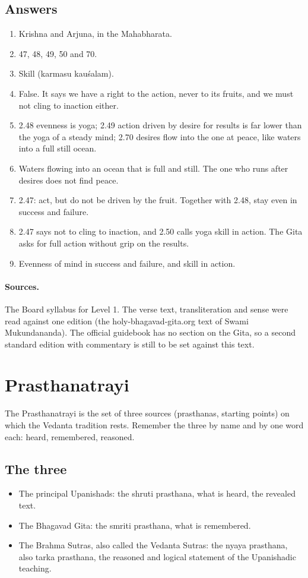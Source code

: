 \subsection*{Answers}
\begin{enumerate}
\item Krishna and Arjuna, in the Mahabharata.
\item 47, 48, 49, 50 and 70.
\item Skill (karmasu kauśalam).
\item False. It says we have a right to the action, never to its fruits, and we must not cling to inaction either.
\item 2.48 evenness is yoga; 2.49 action driven by desire for results is far lower than the yoga of a steady mind; 2.70 desires flow into the one at peace, like waters into a full still ocean.
\item Waters flowing into an ocean that is full and still. The one who runs after desires does not find peace.
\item 2.47: act, but do not be driven by the fruit. Together with 2.48, stay even in success and failure.
\item 2.47 says not to cling to inaction, and 2.50 calls yoga skill in action. The Gita asks for full action without grip on the results.
\item Evenness of mind in success and failure, and skill in action.
\end{enumerate}

\paragraph{Sources.} The Board syllabus for Level 1. The verse text, transliteration and sense were read against one edition (the holy-bhagavad-gita.org text of Swami Mukundananda). The official guidebook has no section on the Gita, so a second standard edition with commentary is still to be set against this text.

\section{Prasthanatrayi}
\label{sec:prasthanatrayi}

The Prasthanatrayi is the set of three sources (prasthanas, starting points) on which the Vedanta tradition rests. Remember the three by name and by one word each: heard, remembered, reasoned.

\subsection*{The three}
\begin{itemize}
\item The principal Upanishads: the shruti prasthana, what is heard, the revealed text.
\item The Bhagavad Gita: the smriti prasthana, what is remembered.
\item The Brahma Sutras, also called the Vedanta Sutras: the nyaya prasthana, also tarka prasthana, the reasoned and logical statement of the Upanishadic teaching.
\end{itemize}

